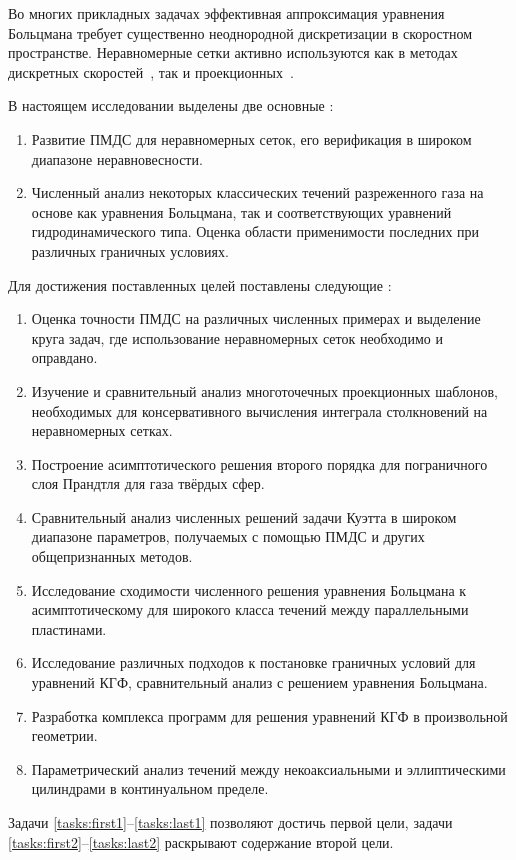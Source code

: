 Во многих прикладных задачах эффективная аппроксимация уравнения Больцмана
требует существенно неоднородной дискретизации в скоростном пространстве.
Неравномерные сетки активно используются
как в методах дискретных скоростей~\autocite{Kolobov2011, Morris2012},
так и проекционных~\autocite{Heintz2008, Wu2014}.

В настоящем исследовании выделены две основные {\aim}:
\begin{enumerate}
    \item Развитие ПМДС для неравномерных сеток, его верификация в широком диапазоне неравновесности.
    \item Численный анализ некоторых классических течений разреженного газа на основе
    как уравнения Больцмана, так и соответствующих уравнений гидродинамического типа.
    Оценка области применимости последних при различных граничных условиях.
\end{enumerate}
Для достижения поставленных целей поставлены следующие {\tasks}:
\begin{enumerate}
    \item Оценка точности ПМДС на различных численных примерах и выделение круга задач,
    где использование неравномерных сеток необходимо и оправдано.\label{tasks:first1}
    \item Изучение и сравнительный анализ многоточечных проекционных шаблонов,
    необходимых для консервативного вычисления интеграла столкновений на неравномерных сетках.
    \item Построение асимптотического решения второго порядка
    для пограничного слоя Прандтля для газа твёрдых сфер. \label{tasks:first2}
    \item Сравнительный анализ численных решений задачи Куэтта в широком диапазоне параметров,
    получаемых с помощью ПМДС и других общепризнанных методов.
    \item Исследование сходимости численного решения уравнения Больцмана к асимптотическому
    для широкого класса течений между параллельными пластинами.
    \item Исследование различных подходов к постановке граничных условий для уравнений КГФ,
    сравнительный анализ с решением уравнения Больцмана.\label{tasks:last1}
    \item Разработка комплекса программ для решения уравнений КГФ в произвольной геометрии.
    \item Параметрический анализ течений между некоаксиальными и эллиптическими цилиндрами
    в континуальном пределе.\label{tasks:last2}
\end{enumerate}
Задачи \ref{tasks:first1}--\ref{tasks:last1} позволяют достичь первой цели,
задачи \ref{tasks:first2}--\ref{tasks:last2} раскрывают содержание второй цели.

